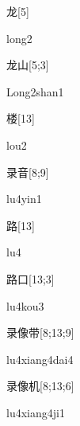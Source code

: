 \begin{verbete}[long2]{龙}[5]
\begin{pronuncia}{long2}
\end{pronuncia}
\end{verbete}

\begin{verbete}{龙山}[5;3]
\begin{pronuncia}{Long2shan1}
\end{pronuncia}
\end{verbete}

\begin{verbete}[lou2]{楼}[13]
\begin{pronuncia}{lou2}
\end{pronuncia}
\end{verbete}

\begin{verbete}[lu4yin1]{录音}[8;9]
\begin{pronuncia}{lu4yin1}
\end{pronuncia}
\end{verbete}

\begin{verbete}[lu4]{路}[13]
\begin{pronuncia}{lu4}
\end{pronuncia}
\end{verbete}

\begin{verbete}[lu4kou3]{路口}[13;3]
\begin{pronuncia}{lu4kou3}
\end{pronuncia}
\end{verbete}

\begin{verbete}{录像带}[8;13;9]
\begin{pronuncia}{lu4xiang4dai4}
\end{pronuncia}
\end{verbete}

\begin{verbete}[lu4xiang4ji1]{录像机}[8;13;6]
\begin{pronuncia}{lu4xiang4ji1}
\end{pronuncia}
\end{verbete}


